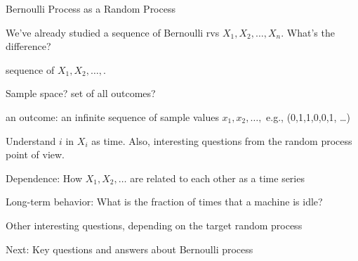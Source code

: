 \documentclass[fleqn,aspectratio=169]{beamer}
\begin{document}
\begin{frame}{Bernoulli Process as a Random Process}

\plitemsep 0.1in
\bci

\item<1->  We've already studied a sequence of Bernoulli rvs $X_1, X_2, \ldots, X_n.$ What's the difference?

\item<2->   sequence of $X_1, X_2, \ldots, .$
\bci
\item<3-> Sample space? set of all outcomes?
\item<4-> an outcome: an infinite sequence of sample values $x_1, x_2, \ldots,$ e.g., (0,1,1,0,0,1, \ldots)
\eci

\item<5->  Understand $i$ in $X_i$ as time. Also, interesting questions from the random process point of view. 
\bci
\item<6-> Dependence: How $X_1, X_2, \ldots$ are related to each other as a time series
\item<7-> Long-term behavior: What is the fraction of times that a machine is idle?
\item<8-> Other interesting questions, depending on the target random process
\eci

\item<9-> Next: Key questions and answers about Bernoulli process
\eci

\end{frame}
\end{document}
